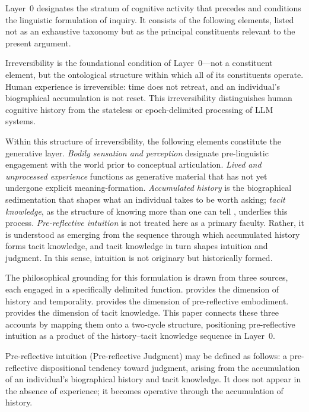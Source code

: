 \documentclass[12pt]{article}
\begin{document}
Layer~0 designates the stratum of cognitive activity that precedes and conditions the linguistic formulation of inquiry. It consists of the following elements, listed not as an exhaustive taxonomy but as the principal constituents relevant to the present argument.

Irreversibility is the foundational condition of Layer~0---not a constituent element, but the ontological structure within which all of its constituents operate. Human experience is irreversible: time does not retreat, and an individual's biographical accumulation is not reset. This irreversibility distinguishes human cognitive history from the stateless or epoch-delimited processing of LLM systems.

Within this structure of irreversibility, the following elements constitute the generative layer. \emph{Bodily sensation and perception} designate pre-linguistic engagement with the world prior to conceptual articulation. \emph{Lived and unprocessed experience} functions as generative material that has not yet undergone explicit meaning-formation. \emph{Accumulated history} is the biographical sedimentation that shapes what an individual takes to be worth asking; \emph{tacit knowledge}, as the structure of knowing more than one can tell \citep{polanyi1966}, underlies this process. \emph{Pre-reflective intuition} is not treated here as a primary faculty. Rather, it is understood as emerging from the sequence through which accumulated history forms tacit knowledge, and tacit knowledge in turn shapes intuition and judgment. In this sense, intuition is not originary but historically formed.

The philosophical grounding for this formulation is drawn from three sources, each engaged in a specifically delimited function. \citet{bergson1896} provides the dimension of history and temporality. \citet{merleauponty1945} provides the dimension of pre-reflective embodiment. \citet{polanyi1966} provides the dimension of tacit knowledge. This paper connects these three accounts by mapping them onto a two-cycle structure, positioning pre-reflective intuition as a product of the history--tacit knowledge sequence in Layer~0.

Pre-reflective intuition (Pre-reflective Judgment) may be defined as follows: a pre-reflective dispositional tendency toward judgment, arising from the accumulation of an individual's biographical history and tacit knowledge. It does not appear in the absence of experience; it becomes operative through the accumulation of history.
\end{document}
